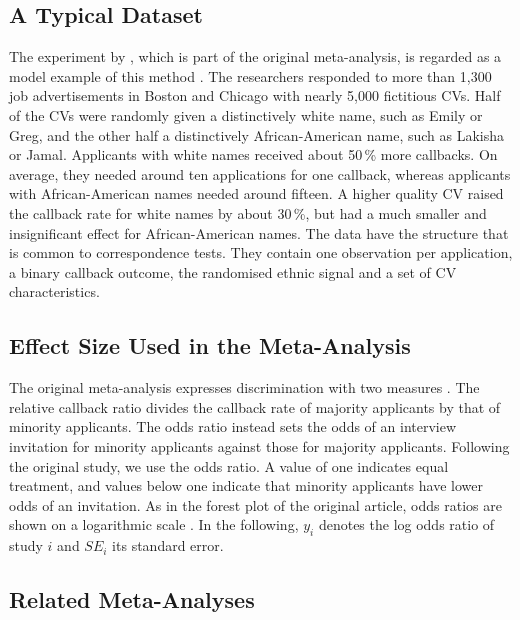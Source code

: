 \documentclass[11pt,a4paper]{article}
\begin{document}
\subsection{A Typical Dataset}

The experiment by \citet{bertrand2004}, which is part of the original
meta-analysis, is regarded as a model example of this method
\citep{pager2007}. The researchers responded to more than 1{,}300 job
advertisements in Boston and Chicago with nearly 5{,}000 fictitious CVs.
Half of the CVs were randomly given a distinctively white name, such as
Emily or Greg, and the other half a distinctively African-American name,
such as Lakisha or Jamal. Applicants with white names received about
50\,\% more callbacks. On average, they needed around ten applications for
one callback, whereas applicants with African-American names needed around
fifteen. A higher quality CV raised the callback rate for white names by
about 30\,\%, but had a much smaller and insignificant effect for
African-American names. The data have the structure that is common to
correspondence tests. They contain one observation per application, a
binary callback outcome, the randomised ethnic signal and a set of CV
characteristics.
\subsection{Effect Size Used in the Meta-Analysis}

The original meta-analysis expresses discrimination with two measures
\citep{zschirnt2016}. The relative callback ratio divides the callback rate
of majority applicants by that of minority applicants. The odds ratio
instead sets the odds of an interview invitation for minority applicants
against those for majority applicants. Following the original study, we use
the odds ratio. A value of one indicates equal treatment, and values below
one indicate that minority applicants have lower odds of an invitation. As
in the forest plot of the original article, odds ratios are shown on a
logarithmic scale \citep{zschirnt2016}. In the following, $y_i$ denotes the
log odds ratio of study $i$ and $SE_i$ its standard error.
\subsection{Related Meta-Analyses}
\end{document}

